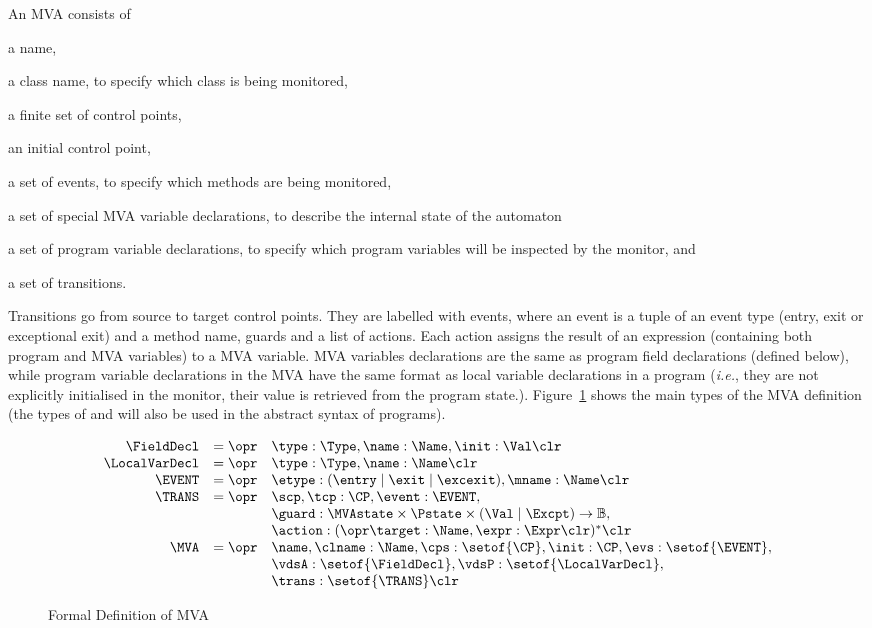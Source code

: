 An MVA consists of
\begin{inparaenum}
\item a name,
\item a class name, to specify which class is being monitored,
\item a finite set of control points,
\item an initial control point,
\item a set of events, to specify which methods are being monitored,
\item a set of special MVA variable declarations, to describe %
the internal state of the automaton
\item a set of program variable declarations, to specify which
program variables will be inspected by the monitor, and
\item a set of transitions.
\end{inparaenum}
Transitions go from source to target control points. They are labelled
with events, where an event is a tuple of an event type (entry, exit
or exceptional exit) and a method name, guards and a list of
actions. Each action assigns the result of an expression (containing
both program and MVA variables) to a MVA variable. MVA variables
declarations are the same as program field declarations (defined
below), while program variable declarations in the MVA have the same
format as local variable declarations in a program (\emph{i.e.}, they
are not explicitly initialised in the monitor, their value is retrieved from
the program state.). Figure~\ref{FigMVAForm} shows the
main types of the MVA definition (the types of \FieldDecl and
\LocalVarDecl will also be used in the abstract syntax of programs).

\begin{figure}[t]
\[
\begin{array}{rcl}
\FieldDecl & = \opr & \type : \Type, \name : \Name, \init : \Val
\clr \\
\LocalVarDecl & = \opr & \type : \Type, \name : \Name \clr \\
\EVENT & = \opr & \etype : (\entry \mid \exit \mid \excexit),
                 \mname : \Name \clr\\
\TRANS & = \opr & \scp, \tcp : \CP, \event : \EVENT, \\
& &
\guard : \MVAstate \times \Pstate \times (\Val \mid \Excpt) \rightarrow \mathbb{B}, \\
&& \action : (\opr \target : \Name, \expr : \Expr \clr)^* \clr\\
\MVA & = \opr & \name, \clname : \Name, \cps : \setof{\CP},
            \init : \CP, \evs : \setof{\EVENT},\\
     &   &  \vdsA : \setof{\FieldDecl}, \vdsP : \setof{\LocalVarDecl},\\
     &   &  \trans : \setof{\TRANS} \clr
\end{array}
\]
\caption{Formal Definition of MVA}\label{FigMVAForm}
\end{figure}

